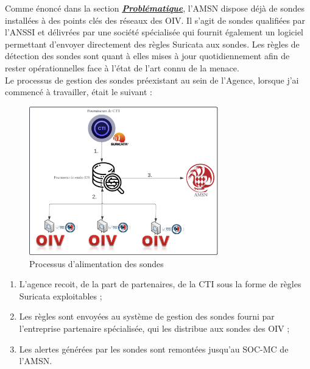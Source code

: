 
Comme énoncé dans la section \hyperref[chap1:section2]{\textit{\textbf{Problématique}}}, l'AMSN dispose déjà de sondes installées à des points clés des réseaux des OIV. Il s'agit de sondes qualifiées par l'ANSSI et délivrées par une société spécialisée qui fournit également un logiciel permettant d'envoyer directement des règles Suricata aux sondes. Les règles de détection des sondes sont quant à elles mises à jour quotidiennement afin de rester opérationnelles face à l'état de l'art connu de la menace. \\

 Le processus de gestion des sondes préexistant au sein de l'Agence, lorsque j'ai commencé à travailler, était le suivant :\\

\begin{figure}[h]%
    \center%
    \includegraphics[width=0.73\textwidth]{assets/shemaProcessAMSN.png}
    \caption[Processus d'alimentation des sondes]{Processus d'alimentation des sondes}\label{fig:shemaProcessAMSN}
\end{figure}

\newpage

\begin{enumerate}[itemsep=1em]
    \item L'agence recoit, de la part de partenaires, de la CTI sous la forme de règles Suricata exploitables ;
    \item Les règles sont envoyées au système de gestion des sondes fourni par l'entreprise partenaire spécialisée, qui les distribue aux sondes des OIV ;
    \item Les alertes générées par les sondes sont remontées jusqu'au SOC-MC de l'AMSN.\\
\end{enumerate}

